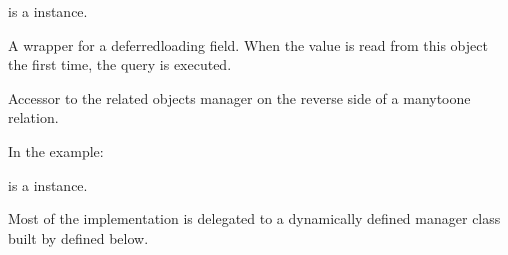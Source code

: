 \documentclass[letterpaper,10pt,english]{sphinxmanual}
\begin{document}
\begin{fulllineitems}
\begin{fulllineitems}
 is a  instance.

\end{fulllineitems}


\begin{fulllineitems}
\label{\detokenize{forums:forums.models.Comment1.comment1_count}}
A wrapper for a deferred\sphinxhyphen{}loading field. When the value is read from this
object the first time, the query is executed.

\end{fulllineitems}


\begin{fulllineitems}
\label{\detokenize{forums:forums.models.Comment1.comment2_set}}
Accessor to the related objects manager on the reverse side of a
many\sphinxhyphen{}to\sphinxhyphen{}one relation.

In the example:

\begin{sphinxVerbatim}[commandchars=\\\{\}]
 
       
\end{sphinxVerbatim}

 is a  instance.

Most of the implementation is delegated to a dynamically defined manager
class built by  defined below.

\end{fulllineitems}



\end{fulllineitems}
\end{document}
